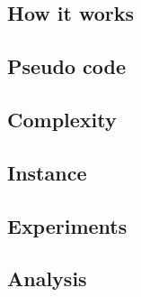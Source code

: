 \documentclass{article}
\begin{document}

    \subsection{How it works}


    \subsection{Pseudo code}


    \subsection{Complexity}


    \subsection{Instance}


    \subsection{Experiments}


    \subsection{Analysis    }
\end{document}
